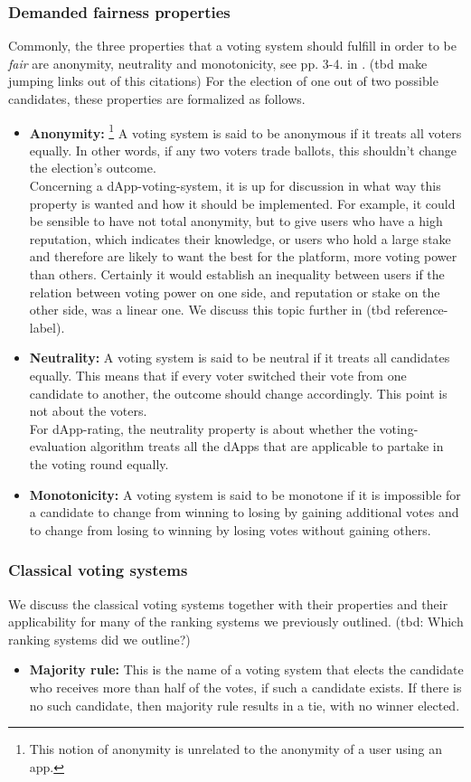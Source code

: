 \subsubsection{Demanded fairness properties}
Commonly, the three properties that a voting system should fulfill in order to be \textit{fair} are anonymity, neutrality and monotonicity, see pp. 3-4. in \cite{voting}. (tbd make jumping links out of this citations) For the election of one out of two possible candidates, these properties are formalized as follows. 
\begin{itemize}
\item {\textbf{Anonymity:}
\footnote{This notion of anonymity is unrelated to the anonymity of a user using an app.}}
A voting system is said to be anonymous if it treats all voters equally. In other words, if any two voters trade ballots, this shouldn't change the election's outcome. \\
Concerning a dApp-voting-system, it is up for discussion in what way this property is wanted and how it should be implemented. For example, it could be sensible to have not total anonymity, but to give users who have a high reputation, which indicates their knowledge, or users who hold a large stake and therefore are likely to want the best for the platform, more voting power than others. Certainly it would establish an inequality between users if the relation between voting power on one side, and reputation or stake on the other side, was a linear one. We discuss this topic further in (tbd reference-label).
\item {\textbf{Neutrality:}} A voting system is said to be neutral if it treats all candidates equally. This means that if every voter switched their vote from one candidate to another, the outcome should change accordingly. 
This point is not about the voters.\\ 
For dApp-rating, the neutrality property is about whether the voting-evaluation algorithm treats all the dApps that are applicable to partake in the voting round equally. 
\item {\textbf{Monotonicity:}} A voting system is said to be monotone if it is impossible for a candidate to change from winning to losing by gaining additional votes and to change from losing to winning by losing votes without gaining others.
\end{itemize} 

\subsubsection{Classical voting systems}
We discuss the classical voting systems together with their properties and their applicability for many of the ranking systems we previously outlined. (tbd: Which ranking systems did we outline?)
\begin{itemize}[leftmargin = 0pt]
\item {\textbf{Majority rule:}} This is the name of a voting system that elects the candidate who receives more than half of the votes, if such a candidate exists. If there is no such candidate, then majority rule results in a tie, with no winner elected.
\end{itemize}


